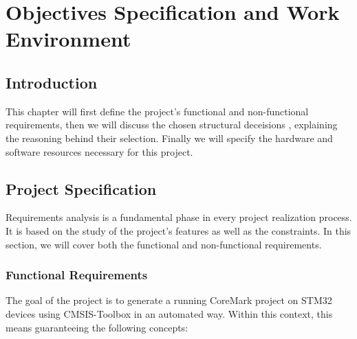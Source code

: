 \chapter{Objectives Specification and Work Environment}

\section*{Introduction}
This chapter will first define the project's functional and non-functional requirements, then we will discuss the chosen structural deceisions , explaining the reasoning behind their selection. Finally we will specify the hardware and software resources necessary for this project. 

\section{Project Specification}
Requirements analysis is a fundamental phase in every project realization process. It is based on the study of the project's features as well as the constraints. In this section, we will cover both the functional and non-functional requirements.

\subsection{Functional Requirements}

The goal of the project is to generate a running CoreMark project on STM32 devices using CMSIS-Toolbox in an automated way. Within this context, this means guaranteeing the following concepts:

%

